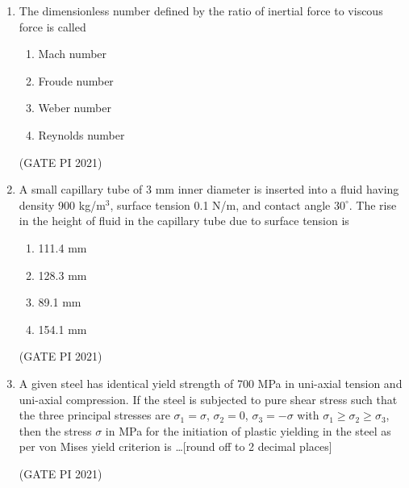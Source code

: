 \documentclass[journal,12pt,onecolumn]{IEEEtran}
\theoremstyle{remark}
\begin{document}
\begin{enumerate}
\begin{multicols}{4}
\begin{enumerate}
\item 10.7
\item 60.9
\item 121.9
\item 1005.3
\end{enumerate}
\end{multicols}

\hfill (GATE PI 2021)

\item
The dimensionless number defined by the ratio of inertial force to viscous force is called
\begin{multicols}{4}
\begin{enumerate}
\item Mach number
\item Froude number
\item Weber number
\item Reynolds number
\end{enumerate}
\end{multicols}
\hfill (GATE PI 2021)

\item
A small capillary tube of 3 mm inner diameter is inserted into a fluid having density 900 kg/m$^3$, surface tension 0.1 N/m, and contact angle $30^\circ$. The rise in the height of fluid in the capillary tube due to surface tension is
\begin{multicols}{4}
\begin{enumerate}
\item 111.4 mm
\item 128.3 mm
\item 89.1 mm
\item 154.1 mm
\end{enumerate}
\end{multicols}

\hfill (GATE PI 2021)

\item
A given steel has identical yield strength of 700 MPa in uni-axial tension and uni-axial compression. If the steel is subjected to pure shear stress such that the three principal stresses are $\sigma_1 = \sigma$, $\sigma_2 = 0$, $\sigma_3 = -\sigma$ with $\sigma_1 \geq \sigma_2 \geq \sigma_3$, then the stress $\sigma$ in MPa for the initiation of plastic yielding in the steel as per von Mises yield criterion is \ldots [round off to 2 decimal places]

\hfill (GATE PI 2021)


\end{enumerate}
\end{document}
